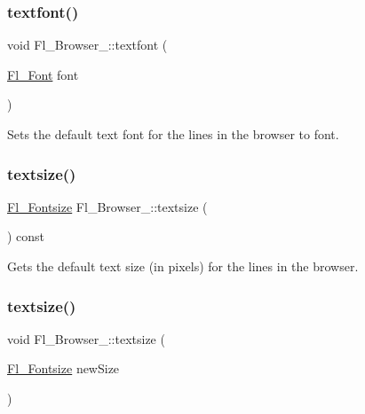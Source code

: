 \subsubsection{\texorpdfstring{textfont()}{textfont()}\hspace{0.1cm}{\footnotesize\ttfamily [2/2]}}
{\footnotesize\ttfamily void Fl\+\_\+\+Browser\+\_\+\+::textfont (\begin{DoxyParamCaption}\item[{\hyperlink{_enumerations_8_h_a2ac46d9f082834b969fffe490a03a709}{Fl\+\_\+\+Font}}]{font }\end{DoxyParamCaption})\hspace{0.3cm}{\ttfamily [inline]}}

Sets the default text font for the lines in the browser to {\ttfamily font}. \mbox{\label{class_fl___browser___a43889aa554fd2285991f73cc11918bda}} 
\subsubsection{\texorpdfstring{textsize()}{textsize()}\hspace{0.1cm}{\footnotesize\ttfamily [1/2]}}
{\footnotesize\ttfamily \hyperlink{_enumerations_8_h_ad58927f5c691454480f7cd28362502f1}{Fl\+\_\+\+Fontsize} Fl\+\_\+\+Browser\+\_\+\+::textsize (\begin{DoxyParamCaption}{ }\end{DoxyParamCaption}) const\hspace{0.3cm}{\ttfamily [inline]}}

Gets the default text size (in pixels) for the lines in the browser. \mbox{\label{class_fl___browser___ad6f0e70675e073dd97e02b5954675861}} 
\subsubsection{\texorpdfstring{textsize()}{textsize()}\hspace{0.1cm}{\footnotesize\ttfamily [2/2]}}
{\footnotesize\ttfamily void Fl\+\_\+\+Browser\+\_\+\+::textsize (\begin{DoxyParamCaption}\item[{\hyperlink{_enumerations_8_h_ad58927f5c691454480f7cd28362502f1}{Fl\+\_\+\+Fontsize}}]{new\+Size }\end{DoxyParamCaption})\hspace{0.3cm}{\ttfamily [inline]}}

